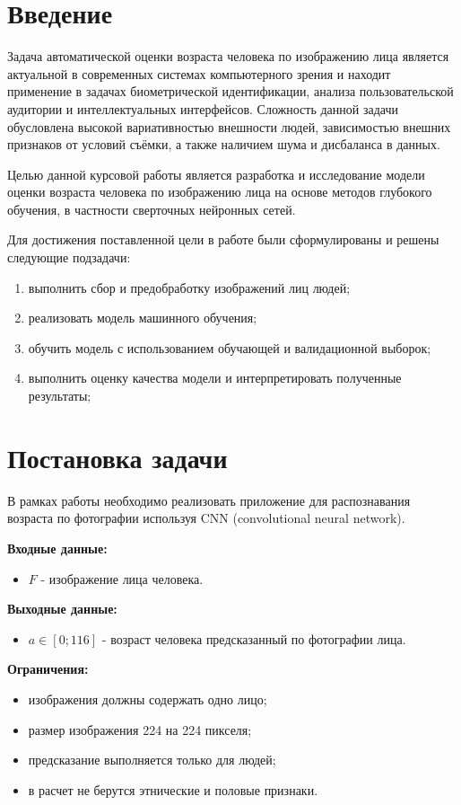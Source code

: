 \chapter*{Введение}
Задача автоматической оценки возраста человека по изображению лица является актуальной в современных системах компьютерного зрения и находит применение в задачах биометрической идентификации, анализа пользовательской аудитории и интеллектуальных интерфейсов. Сложность данной задачи обусловлена высокой вариативностью внешности людей, зависимостью внешних признаков от условий съёмки, а также наличием шума и дисбаланса в данных.

Целью данной курсовой работы является разработка и исследование модели оценки возраста человека по изображению лица на основе методов глубокого обучения, в частности сверточных нейронных сетей.

Для достижения поставленной цели в работе были сформулированы и решены следующие подзадачи:
\begin{enumerate}
	\item выполнить сбор и предобработку изображений лиц людей;
	\item реализовать модель машинного обучения;
	\item обучить модель с использованием обучающей и валидационной выборок;
	\item выполнить оценку качества модели и интерпретировать полученные результаты;
\end{enumerate}


\chapter{Постановка задачи}
В рамках работы необходимо реализовать приложение для распознавания возраста по фотографии используя CNN (convolutional neural network).


\textbf{Входные данные:}
\begin{itemize}[]
	\item $F$ - изображение лица человека.
\end{itemize}


\textbf{Выходные данные:}
\begin{itemize}[]
	\item $a \in [0;116]$ - возраст человека предсказанный по фотографии лица.
\end{itemize}

\textbf{Ограничения:}
\begin{itemize}[]
	\item изображения должны содержать одно лицо;
	\item размер изображения 224 на 224 пикселя;
	\item предсказание выполняется только для людей;
	\item в расчет не берутся этнические и половые признаки.
\end{itemize}